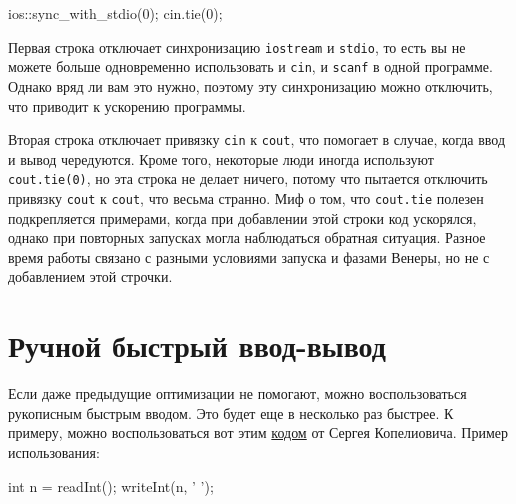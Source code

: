 \begin{code}
    ios::sync_with_stdio(0);
    cin.tie(0);
\end{code}

Первая строка отключает синхронизацию \verb+iostream+ и \verb+stdio+, то есть вы не можете больше одновременно использовать и \verb+cin+, и \verb+scanf+ в одной программе. Однако вряд ли вам это нужно, поэтому эту синхронизацию можно отключить, что приводит к ускорению программы.

Вторая строка отключает привязку \verb+cin+ к \verb+cout+, что помогает в случае, когда ввод и вывод чередуются. Кроме того, некоторые люди иногда используют \verb+cout.tie(0)+, но эта строка не делает ничего, потому что пытается отключить привязку \verb+cout+ к \verb+cout+, что весьма странно. Миф о том, что \verb+cout.tie+ полезен подкрепляется примерами, когда при добавлении этой строки код ускорялся, однако при повторных запусках могла наблюдаться обратная ситуация. Разное время работы связано с разными условиями запуска и фазами Венеры, но не с добавлением этой строчки.

\section{Ручной быстрый ввод-вывод}

Если даже предыдущие оптимизации не помогают, можно воспользоваться рукописным быстрым вводом. Это будет еще в несколько раз быстрее. К примеру, можно воспользоваться вот этим \href{https://pastebin.com/W5rjcUiE}{кодом} от Сергея Копелиовича. Пример использования:

\begin{code}
    int n = readInt();
    writeInt(n, ' ');
\end{code}
